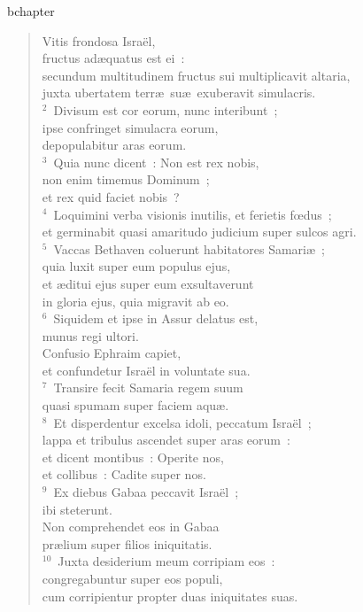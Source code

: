 bchapter\begin{verse}\vspace{-19pt}Vitis frondosa Isra\"el,\\ fructus ad\ae quatus est ei~:\\ secundum multitudinem fructus sui multiplicavit altaria,\\ juxta ubertatem terr\ae\ su\ae\ exuberavit simulacris.\\
${}^{2}$~Divisum est cor eorum, nunc interibunt~;\\ ipse confringet simulacra eorum,\\ depopulabitur aras eorum.\\
${}^{3}$~Quia nunc dicent~: Non est rex nobis,\\ non enim timemus Dominum~;\\ et rex quid faciet nobis~?\\
${}^{4}$~Loquimini verba visionis inutilis, et ferietis fœdus~;\\ et germinabit quasi amaritudo judicium super sulcos agri.\\
${}^{5}$~Vaccas Bethaven coluerunt habitatores Samari\ae~;\\ quia luxit super eum populus ejus,\\ et \ae ditui ejus super eum exsultaverunt\\ in gloria ejus, quia migravit ab eo.\\
${}^{6}$~Siquidem et ipse in Assur delatus est,\\ munus regi ultori.\\ Confusio Ephraim capiet,\\ et confundetur Isra\"el in voluntate sua.\\
${}^{7}$~Transire fecit Samaria regem suum\\ quasi spumam super faciem aqu\ae .\\
${}^{8}$~Et disperdentur excelsa idoli, peccatum Isra\"el~;\\ lappa et tribulus ascendet super aras eorum~:\\ et dicent montibus~: Operite nos,\\ et collibus~: Cadite super nos.\\
${}^{9}$~Ex diebus Gabaa peccavit Isra\"el~;\\ ibi steterunt.\\ Non comprehendet eos in Gabaa\\ pr\ae lium super filios iniquitatis.\\
${}^{10}$~Juxta desiderium meum corripiam eos~:\\ congregabuntur super eos populi,\\ cum corripientur propter duas iniquitates suas.\\

\end{verse}
